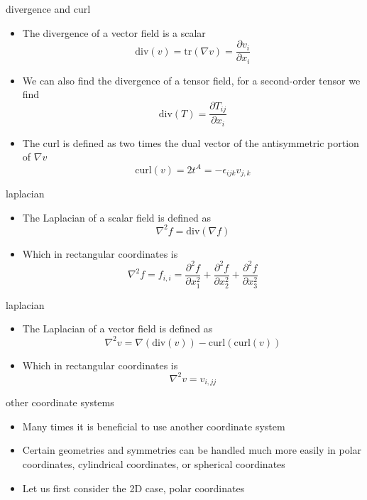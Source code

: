 \begin{frame}{divergence and curl}
\protect\hypertarget{divergence-and-curl}{}
\begin{itemize}
\tightlist
\item
  The divergence of a vector field is a scalar
  \[\text{div} (v) = \text{tr} (\nabla v) = \frac{\partial v_i}{\partial x_i}\]
\item
  We can also find the divergence of a tensor field, for a second-order
  tensor we find
  \[\text{div} (T) = \frac{\partial T_{ij}}{\partial x_i}\]
\item
  The curl is defined as two times the dual vector of the antisymmetric
  portion of \(\nabla v\)
  \[\text{curl}(v) = 2t^A = -\epsilon_{ijk}v_{j,k}\]
\end{itemize}
\end{frame}

\begin{frame}{laplacian}
\protect\hypertarget{laplacian}{}
\begin{itemize}
\item
  The Laplacian of a scalar field is defined as
  \[\nabla^2 f = \text{div} (\nabla f)\]
\item
  Which in rectangular coordinates is
  \[\nabla^2 f = f_{i,i} = \frac{\partial^2 f}{\partial x_1^2} + \frac{\partial^2 f}{\partial x_2^2} + \frac{\partial^2 f}{\partial x_3^2}\]
\end{itemize}
\end{frame}

\begin{frame}{laplacian}
\protect\hypertarget{laplacian-1}{}
\begin{itemize}
\item
  The Laplacian of a vector field is defined as
  \[\nabla^2 v = \nabla (\text{div} (v)) - \text{curl}(\text{curl}(v))\]
\item
  Which in rectangular coordinates is \[\nabla^2 v = v_{i,jj}\]
\end{itemize}
\end{frame}

\begin{frame}{other coordinate systems}
\protect\hypertarget{other-coordinate-systems}{}
\begin{itemize}
\item
  Many times it is beneficial to use another coordinate system
\item
  Certain geometries and symmetries can be handled much more easily in
  polar coordinates, cylindrical coordinates, or spherical coordinates
\item
  Let us first consider the 2D case, polar coordinates
\end{itemize}
\end{frame}

